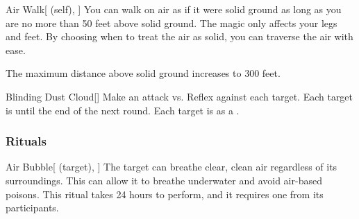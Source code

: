 \lowercase{\hypertarget{spell:Air Walk}{}}\label{spell:Air Walk}
\begin{attuneability}[Rank 6]{\hypertarget{spell:Air Walk}{Air Walk}}[ (self), ]
You can walk on air as if it were solid ground as long as you are no more than 50 feet above solid ground.
The magic only affects your legs and feet.
By choosing when to treat the air as solid, you can traverse the air with ease.

\rankline
{} The maximum distance above solid ground increases to 300 feet.

\end{attuneability}
\vspace{0.25em}



\lowercase{\hypertarget{spell:Blinding Dust Cloud}{}}\label{spell:Blinding Dust Cloud}
\begin{freeability}[Rank 7]{\hypertarget{spell:Blinding Dust Cloud}{Blinding Dust Cloud}}[]
Make an attack vs. Reflex against each target.
\hit Each target is  until the end of the next round.
\crit Each target is  as a .

\end{freeability}
\vspace{0.25em}



\subsubsection{Rituals}


\lowercase{\hypertarget{spell:Air Bubble}{}}\label{spell:Air Bubble}
\begin{attuneability}[Rank 3]{\hypertarget{spell:Air Bubble}{Air Bubble}}[ (target), ]
The target can breathe clear, clean air regardless of its surroundings.
This can allow it to breathe underwater and avoid air-based poisons.
This ritual takes 24 hours to perform, and it requires one  from its participants.
\end{attuneability}
\vspace{0.25em}


